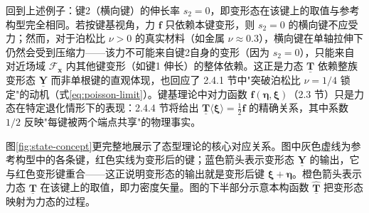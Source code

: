 回到上述例子：键2（横向键）的伸长率 $s_2=0$，即变形态在该键上的取值与参考构型完全相同。若按键基视角，力 $\mathbf{f}$ 只依赖本键变形，则 $s_2=0$ 的横向键不应受力；然而，对于泊松比 $\nu>0$ 的真实材料（如金属 $\nu\approx0.3$），横向键在单轴拉伸下仍然会受到压缩力——该力不可能来自键2自身的变形（因为 $s_2=0$），只能来自对近场域 $\mathcal{F}_{\mathbf{x}}$ 内其他键变形（如键1 伸长）的整体依赖。这正是力态 $\underline{\mathbf{T}}$ 依赖整族变形态 $\underline{\mathbf{Y}}$ 而非单根键的直观体现，也回应了 2.4.1 节中"突破泊松比 $\nu=1/4$ 锁定"的动机（式\eqref{eq:poisson-limit}）。键基理论中对力函数 $\mathbf{f}(\boldsymbol{\eta},\boldsymbol{\xi})$（2.3 节）只是力态在特定退化情形下的表现：2.4.4 节将给出 $\underline{\mathbf{T}}\langle\boldsymbol{\xi}\rangle=\tfrac{1}{2}\mathbf{f}$ 的精确关系，其中系数 $1/2$ 反映"每键被两个端点共享"的物理事实。

图\ref{fig:state-concept}更完整地展示了态型理论的核心对应关系。图中灰色虚线为参考构型中的各条键，红色实线为变形后的键；蓝色箭头表示变形态 $\underline{\mathbf{Y}}$ 的输出，它与红色变形键重合——这正说明变形态的输出就是变形后键 $\boldsymbol{\xi}+\boldsymbol{\eta}$。橙色箭头表示力态 $\underline{\mathbf{T}}$ 在该键上的取值，即力密度矢量。图的下半部分示意本构函数 $\hat{\underline{\mathbf{T}}}$ 把变形态映射为力态的过程。

